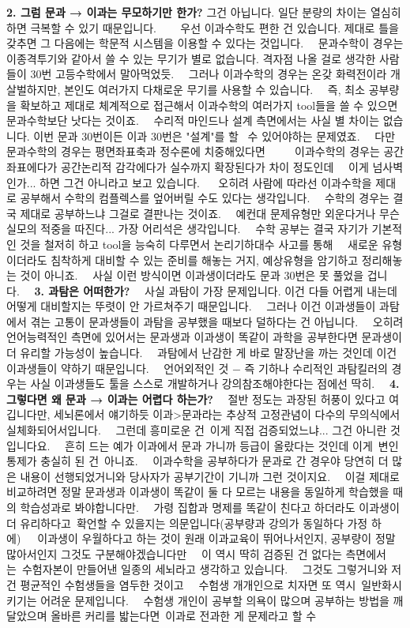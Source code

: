 \item \textbf{2. 그럼 문과 → 이과는 무모하기만 한가?}
그건 아닙니다. 일단 분량의 차이는 열심히 하면 극복할 수 있기 때문입니다.     우선 이과수학도 편한 건 있습니다. 제대로 틀을 갖추면 그 다음에는 학문적 시스템을 이용할 수 있다는 것입니다.   문과수학이 경우는 이종격투기와 같아서 쓸 수 있는 무기가 별로 없습니다. 격자점 나올 걸로 생각한 사람들이 30번 고등수학에서 말아먹었듯.   그러나 이과수학의 경우는 온갖 화력전이라 개살벌하지만, 본인도 여러가지 다채로운 무기를 사용할 수 있습니다.   즉, 최소 공부량을 확보하고 제대로 체계적으로 접근해서 이과수학의 여러가지 tool들을 쓸 수 있으면 문과수학보단 낫다는 것이죠.   수리적 마인드나 설계 측면에서는 사실 별 차이는 없습니다. 이번 문과 30번이든 이과 30번은 "설계"를 할  수 있어야하는 문제였죠.   다만 문과수학의 경우는 평면좌표축과 정수론에 치중해있다면      이과수학의 경우는 공간좌표에다가 공간논리적 감각에다가 실수까지 확장된다가 차이 정도인데   이게 넘사벽인가... 하면 그건 아니라고 보고 있습니다.    오히려 사람에 따라선 이과수학을 제대로 공부해서 수학의 컴플렉스를 엎어버릴 수도 있다는 생각입니다.   수학의 경우는 결국 제대로 공부하느냐 그걸로 결판나는 것이죠.   예컨대 문제유형만 외운다거나 무슨 실모의 적중을 따진다... 가장 어리석은 생각입니다.   수학 공부는 결국 자기가 기본적인 것을 철저히 하고 tool을 능숙히 다루면서 논리기하대수 사고를 통해   새로운 유형이더라도 침착하게 대비할 수 있는 준비를 해놓는 거지, 예상유형을 암기하고 정리해놓는 것이 아니죠.   사실 이런 방식이면 이과생이더라도 문과 30번은 못 풀었을 겁니다.   \textbf{3. 과탐은 어떠한가?}   사실 과탐이 가장 문제입니다. 이건 다들 어렵게 내는데 어떻게 대비할지는 뚜렷이 안 가르쳐주기 때문입니다.   그러나 이건 이과생들이 과탐에서 겪는 고통이 문과생들이 과탐을 공부했을 때보다 덜하다는 건 아닙니다.   오히려 언어능력적인 측면에 있어서는 문과생과 이과생이 똑같이 과학을 공부한다면 문과생이 더 유리할 가능성이 높습니다.   과탐에서 난감한 게 바로 말장난을 까는 것인데 이건 이과생들이 약하기 때문입니다.   언어외적인 것 $-$ 즉 기하나 수리적인 과탐킬러의 경우는 사실 이과생들도 툴을 스스로 개발하거나 강의참조해야한다는 점에선 딱히.   \textbf{4. 그렇다면 왜 문과 → 이과는 어렵다 하는가?}   절반 정도는 과장된 허풍이 있다고 여깁니다만, 세뇌론에서 얘기하듯 이과>문과라는 추상적 고정관념이 다수의 무의식에서 실체화되어서입니다.   그런데 흥미로운 건 이게 직접 검증되었느냐... 그건 아니란 것입니다요.   흔히 드는 예가 이과에서 문과 가니까 등급이 올랐다는 것인데 이게 변인통제가 충실히 된 건 아니죠.   이과수학을 공부하다가 문과로 간 경우야 당연히 더 많은 내용이 선행되었거니와 당사자가 공부기간이 기니까 그런 것이지요.   이걸 제대로 비교하려면 정말 문과생과 이과생이 똑같이 둘 다 모르는 내용을 동일하게 학습했을 때의 학습성과로 봐야합니다만.   가령 집합과 명제를 똑같이 친다고 하더라도 이과생이 더 유리하다고 확언할 수 있을지는 의문입니다(공부량과 강의가 동일하다 가정 하에)   이과생이 우월하다고 하는 것이 원래 이과교육이 뛰어나서인지, 공부량이 정말 많아서인지 그것도 구분해야겠습니다만   이 역시 딱히 검증된 건 없다는 측면에서는 수험자본이 만들어낸 일종의 세뇌라고 생각하고 있습니다.   그것도 그렇거니와 저건 평균적인 수험생들을 염두한 것이고   수험생 개개인으로 치자면 또 역시 일반화시키기는 어려운 문제입니다.   수험생 개인이 공부할 의욕이 많으며 공부하는 방법을 깨달았으며 올바른 커리를 밟는다면 이과로 전과한 게 문제라고 할 수 